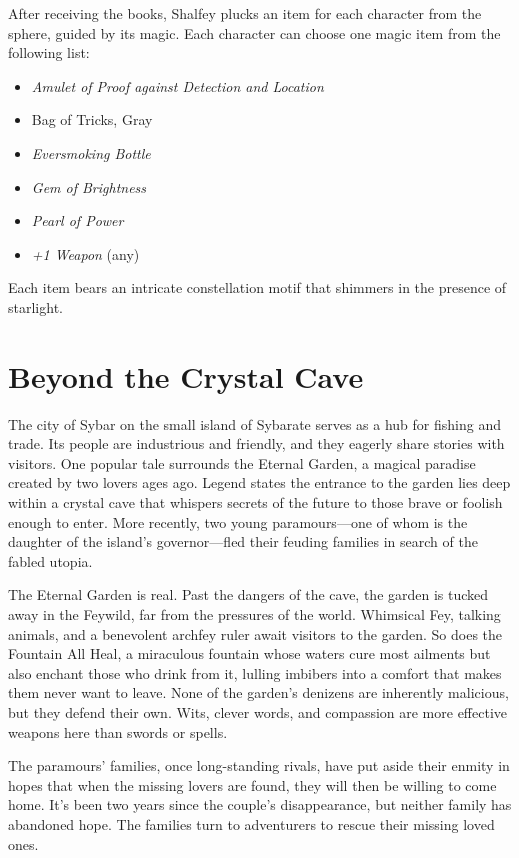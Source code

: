 \documentclass[10pt,a4paper,twoside,bg=print,twocolumn,openany,nodeprecatedcode]{dndbook}
\begin{document}
After receiving the books, Shalfey plucks an item for each character from the sphere, guided by its magic. Each character can choose one magic item from the following list:


\begin{itemize}
\item \textit{Amulet of Proof against Detection and Location}
\item Bag of Tricks, Gray
\item \textit{Eversmoking Bottle}
\item \textit{Gem of Brightness}
\item \textit{Pearl of Power}
\item \textit{+1 Weapon} (any)
\end{itemize}

Each item bears an intricate constellation motif that shimmers in the presence of starlight.

\chapter{Beyond the Crystal Cave}
The city of Sybar on the small island of Sybarate serves as a hub for fishing and trade. Its people are industrious and friendly, and they eagerly share stories with visitors. One popular tale surrounds the Eternal Garden, a magical paradise created by two lovers ages ago. Legend states the entrance to the garden lies deep within a crystal cave that whispers secrets of the future to those brave or foolish enough to enter. More recently, two young paramours—one of whom is the daughter of the island's governor—fled their feuding families in search of the fabled utopia.

The Eternal Garden is real. Past the dangers of the cave, the garden is tucked away in the Feywild, far from the pressures of the world. Whimsical Fey, talking animals, and a benevolent archfey ruler await visitors to the garden. So does the Fountain All Heal, a miraculous fountain whose waters cure most ailments but also enchant those who drink from it, lulling imbibers into a comfort that makes them never want to leave. None of the garden's denizens are inherently malicious, but they defend their own. Wits, clever words, and compassion are more effective weapons here than swords or spells.

The paramours' families, once long-standing rivals, have put aside their enmity in hopes that when the missing lovers are found, they will then be willing to come home. It's been two years since the couple's disappearance, but neither family has abandoned hope. The families turn to adventurers to rescue their missing loved ones.
\end{document}
